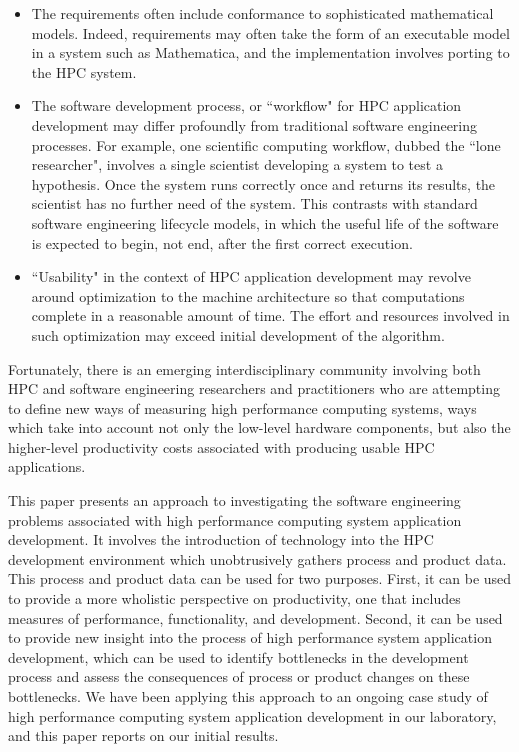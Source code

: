 \documentclass[times,10pt,twocolumn]{article}
\begin{document}
\begin{itemize}

\item The requirements often include conformance to sophisticated
mathematical models. Indeed, requirements may often take the form of an
executable model in a system such as Mathematica, and the implementation
involves porting to the HPC system.
       
\item The software development process, or ``workflow" for HPC application
development may differ profoundly from traditional software engineering
processes. For example, one scientific computing workflow, dubbed the
``lone researcher", involves a single scientist developing a system to test
a hypothesis. Once the system runs correctly once and returns its results,
the scientist has no further need of the system. This contrasts with
standard software engineering lifecycle models, in which the useful life of
the software is expected to begin, not end, after the first correct
execution.
       
\item ``Usability" in the context of HPC application development may
revolve around optimization to the machine architecture so that
computations complete in a reasonable amount of time. The effort and
resources involved in such optimization may exceed initial development of
the algorithm.

\end{itemize}

Fortunately, there is an emerging interdisciplinary community involving
both HPC and software engineering researchers and practitioners who are
attempting to define new ways of measuring high performance computing
systems, ways which take into account not only the low-level hardware
components, but also the higher-level productivity costs associated with
producing usable HPC applications.

This paper presents an approach to investigating the software engineering
problems associated with high performance computing system application
development.  It involves the introduction of technology into the HPC
development environment which unobtrusively gathers process and product
data.  This process and product data can be used for two purposes. First,
it can be used to provide a more wholistic perspective on productivity, one
that includes measures of performance, functionality, and development.
Second, it can be used to provide new insight into the process of high
performance system application development, which can be used to identify
bottlenecks in the development process and assess the consequences of
process or product changes on these bottlenecks.  We have been applying
this approach to an ongoing case study of high performance computing system
application development in our laboratory, and this paper reports on our
initial results.
\end{document}
